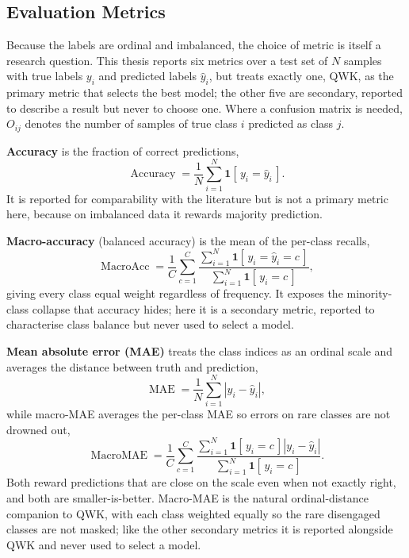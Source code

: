 \documentclass[../main.tex]{subfiles}
\begin{document}
\FloatBarrier
\subsection{Evaluation Metrics}
\label{sec:metrics-lit}

Because the labels are ordinal and imbalanced, the choice of metric is itself a research question. This thesis reports six metrics over a test set of $N$ samples with true labels $y_i$ and predicted labels $\widehat{y}_i$, but treats exactly one, QWK, as the primary metric that selects the best model; the other five are secondary, reported to describe a result but never to choose one. Where a confusion matrix is needed, $O_{ij}$ denotes the number of samples of true class $i$ predicted as class $j$.

\textbf{Accuracy} is the fraction of correct predictions,
\begin{equation}
\operatorname{Accuracy}=\frac{1}{N}\sum_{i=1}^{N}\mathbf{1}\!\left[\,y_i=\widehat{y}_i\,\right].
\end{equation}
It is reported for comparability with the literature but is not a primary metric here, because on imbalanced data it rewards majority prediction.

\textbf{Macro-accuracy} (balanced accuracy) is the mean of the per-class recalls,
\begin{equation}
\operatorname{MacroAcc} = \frac{1}{C}\sum_{c=1}^{C}\frac{\sum_{i=1}^{N}\mathbf{1}\!\left[\,y_i=\widehat{y}_i=c\,\right]}{\sum_{i=1}^{N}\mathbf{1}\!\left[\,y_i=c\,\right]},
\end{equation}
giving every class equal weight regardless of frequency. It exposes the minority-class collapse that accuracy hides; here it is a secondary metric, reported to characterise class balance but never used to select a model.

\textbf{Mean absolute error (MAE)} treats the class indices as an ordinal scale and averages the distance between truth and prediction,
\begin{equation}
\operatorname{MAE} = \frac{1}{N}\sum_{i=1}^{N}\left|y_i-\widehat{y}_i\right|,
\end{equation}
while macro-MAE averages the per-class MAE so errors on rare classes are not drowned out,
\begin{equation}
\operatorname{MacroMAE} = \frac{1}{C}\sum_{c=1}^{C}\frac{\sum_{i=1}^{N}\mathbf{1}\!\left[\,y_i=c\,\right]\left|y_i-\widehat{y}_i\right|}{\sum_{i=1}^{N}\mathbf{1}\!\left[\,y_i=c\,\right]}.
\end{equation}
Both reward predictions that are close on the scale even when not exactly right, and both are smaller-is-better. Macro-MAE is the natural ordinal-distance companion to QWK, with each class weighted equally so the rare disengaged classes are not masked; like the other secondary metrics it is reported alongside QWK and never used to select a model.
\end{document}
